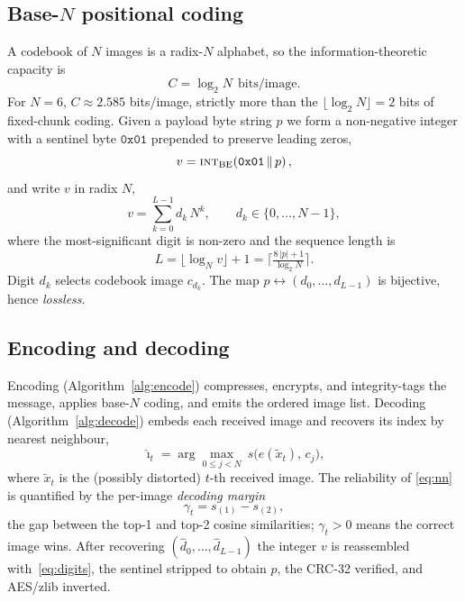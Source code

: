 \documentclass[10pt]{article}
\begin{document}

\subsection{Base-$N$ positional coding}\label{sec:basen}
A codebook of $N$ images is a radix-$N$ alphabet, so the information-theoretic
capacity is
\begin{equation}
  C=\log_2 N \ \ \text{bits/image}.
  \label{eq:cap}
\end{equation}
For $N{=}6$, $C\approx2.585$ bits/image, strictly more than the
$\lfloor\log_2 N\rfloor=2$ bits of fixed-chunk coding. Given a payload byte string
$p$ we form a non-negative integer with a sentinel byte $\mathtt{0x01}$ prepended
to preserve leading zeros,
\begin{equation}
  v=\textsc{int}_{\text{BE}}\!\left(\mathtt{0x01}\,\Vert\,p\right),
  \label{eq:int}
\end{equation}
and write $v$ in radix $N$,
\begin{equation}
  v=\sum_{k=0}^{L-1} d_k\,N^{k},\qquad d_k\in\{0,\dots,N-1\},
  \label{eq:digits}
\end{equation}
where the most-significant digit is non-zero and the sequence length is
\begin{equation}
  L=\big\lfloor \log_N v\big\rfloor+1=\Big\lceil \tfrac{8\,|p|+1}{\log_2 N}\Big\rceil .
  \label{eq:len}
\end{equation}
Digit $d_k$ selects codebook image $c_{d_k}$. The map
$p\!\leftrightarrow\!(d_0,\dots,d_{L-1})$ is bijective, hence \emph{lossless}.

\subsection{Encoding and decoding}
Encoding (Algorithm~\ref{alg:encode}) compresses, encrypts, and integrity-tags
the message, applies base-$N$ coding, and emits the ordered image list. Decoding
(Algorithm~\ref{alg:decode}) embeds each received image and recovers its index by
nearest neighbour,
\begin{equation}
  \hat{\imath}_t=\arg\max_{0\le j<N}\ s\big(e(\tilde{x}_t),\,c_j\big),
  \label{eq:nn}
\end{equation}
where $\tilde{x}_t$ is the (possibly distorted) $t$-th received image. The
reliability of \eqref{eq:nn} is quantified by the per-image \emph{decoding margin}
\begin{equation}
  \gamma_t=s_{(1)}-s_{(2)},
  \label{eq:margin}
\end{equation}
the gap between the top-1 and top-2 cosine similarities; $\gamma_t>0$ means the
correct image wins. After recovering $(\hat d_0,\dots,\hat d_{L-1})$ the integer
$v$ is reassembled with~\eqref{eq:digits}, the sentinel stripped to obtain $p$,
the CRC-32 verified, and AES/zlib inverted.
\end{document}
